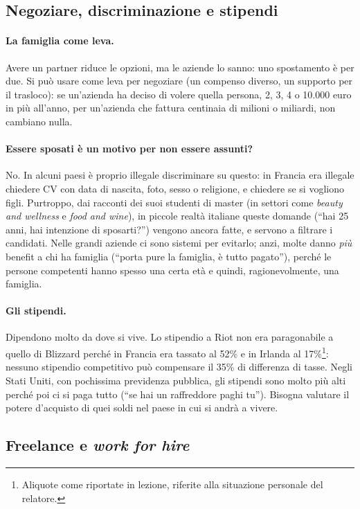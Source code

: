 \subsection{Negoziare, discriminazione e stipendi}

\paragraph{La famiglia come leva.} Avere un partner riduce le opzioni, ma le
aziende lo sanno: uno spostamento è per due. Si può usare come leva per
negoziare (un compenso diverso, un supporto per il trasloco): se un'azienda ha
deciso di volere quella persona, 2, 3, 4 o 10.000 euro in più all'anno, per
un'azienda che fattura centinaia di milioni o miliardi, non cambiano nulla.

\paragraph{Essere sposati è un motivo per non essere assunti?} No. In alcuni
paesi è proprio illegale discriminare su questo: in Francia era illegale
chiedere CV con data di nascita, foto, sesso o religione, e chiedere se si
vogliono figli. Purtroppo, dai racconti dei suoi studenti di master (in
settori come \emph{beauty and wellness} e \emph{food and wine}), in piccole
realtà italiane queste domande (``hai 25 anni, hai intenzione di
sposarti?'') vengono ancora fatte, e servono a filtrare i candidati. Nelle
grandi aziende ci sono sistemi per evitarlo; anzi, molte danno \emph{più}
benefit a chi ha famiglia (``porta pure la famiglia, è tutto pagato''),
perché le persone competenti hanno spesso una certa età e quindi,
ragionevolmente, una famiglia.

\paragraph{Gli stipendi.} Dipendono molto da dove si vive. Lo stipendio a Riot
non era paragonabile a quello di Blizzard perché in Francia era tassato al
52\% e in Irlanda al 17\%\footnote{Aliquote come riportate in lezione,
riferite alla situazione personale del relatore.}: nessuno stipendio
competitivo può compensare il 35\% di differenza di tasse. Negli Stati Uniti,
con pochissima previdenza pubblica, gli stipendi sono molto più alti perché
poi ci si paga tutto (``se hai un raffreddore paghi tu''). Bisogna valutare il
potere d'acquisto di quei soldi nel paese in cui si andrà a vivere.

\subsection{Freelance e \emph{work for hire}}

